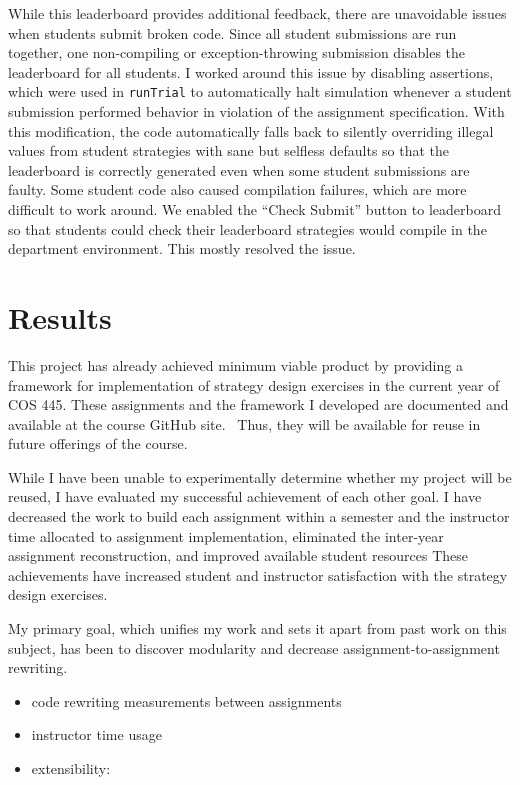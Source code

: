 \documentclass[pageno]{jpaper}
\begin{document}
While this leaderboard provides additional feedback, there are unavoidable issues when students submit broken code.
Since all student submissions are run together, one non-compiling or exception-throwing submission disables the leaderboard for all students.
I worked around this issue by disabling assertions, which were used in \texttt{runTrial} to automatically halt simulation whenever a student submission performed behavior in violation of the assignment specification.
With this modification, the code automatically falls back to silently overriding illegal values from student strategies with sane but selfless defaults so that the leaderboard is correctly generated even when some student submissions are faulty.
Some student code also caused compilation failures, which are more difficult to work around.
We enabled the ``Check Submit'' button to leaderboard so that students could check their leaderboard strategies would compile in the department environment.
This mostly resolved the issue.

\section*{Results}
This project has already achieved minimum viable product by providing a framework for implementation of strategy design exercises in the current year of COS 445.
These assignments and the framework I developed are documented and available at the course GitHub site.~\cite{https://github.com/PrincetonUniversity/cos445-hw/tree/s18 requires invite}
Thus, they will be available for reuse in future offerings of the course.

While I have been unable to experimentally determine whether my project will be reused, I have evaluated my successful achievement of each other goal.
I have decreased the work to build each assignment within a semester and the instructor time allocated to assignment implementation, eliminated the inter-year assignment reconstruction, and improved available student resources
These achievements have increased student and instructor satisfaction with the strategy design exercises.

My primary goal, which unifies my work and sets it apart from past work on this subject, has been to discover modularity and decrease assignment-to-assignment rewriting.
\begin{itemize}
\item code rewriting measurements between assignments
\item instructor time usage
\item extensibility:
\end{itemize}
\end{document}
